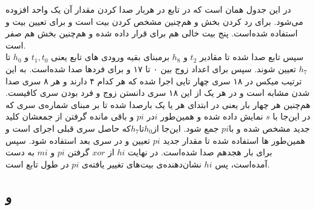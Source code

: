 در این جدول  همان  است که در تابع\hyperref[subsec:skein-big-core]{} در هربار صدا کردن  مقدار آن یک واحد افزوده می‌شود.  برای رد کردن بخش  و هم‌چنین مشخص کردن بیت   است و  برای تعیین بیت  و  استفاده شده‌است. پنج بیت خالی هم برای قرار داده شده و هم‌چنین بخش  هم صفر است.
\\
سپس تابع\hyperref[subsec:TFBIG-KINIT]{}
صدا شده تا مقادیر $ t_2 $ و $ h_8 $ برمبنای بقیه ورودی های تابع یعنی $ t_1 , t_0 $ و $ h_0 $ تا $ h_7 $ تعیین شوند. سپس برای اعداد زوج بین ۰ تا ۱۷\hyperref[subsec:TFBIG-4e]{} و برای فردها \hyperref[subsec:TFBIG-4o]{} صدا شده‌است. به این ترتیب میکس در ۱۸ سری چهار تایی اجرا شده که هر کدام ۴  دارند و هر ۸ سری صدا شدن مشابه است و در هر یک از این ۱۸ سری دانستن زوج و فرد بودن سری کافیست. هم‌چنین هر چهار بار یعنی در ابتدای هر یا یک بار\hyperref[subsec:TFBIG-ADDKEY]{}صدا شده تا بر مبنای شماره‌ی سری که در این‌جا با $ s$ نمایش داده شده و همین‌طور $ i $در $ pi $ و باقی مانده گرفتن از جمعشان کلید جدید مشخص شده و با$ pi $ جمع شود. این‌جا از$ h_0 $تا$ h_7 $که حاصل سری قبلی اجرای است و همین‌طور  ها استفاده شده تا مقدار جدید $ pi $ تعیین و در سری بعد استفاده شود. سپس برای بار هجدهم  صدا شده‌است. در نهایت $ hi $ از $ xor $ گرفتن $pi $ و $ mi $ به دست ‌آمده‌است، پس ‌‌‌$ hi $ نشان‌دهنده‌ی بیت‌های تغییر یافته‌ی ‌$ pi $ در طول تابع است.


\subsection{و }
\label{subsec:TFBIG-4e}
\label{subsec:TFBIG-4o}


